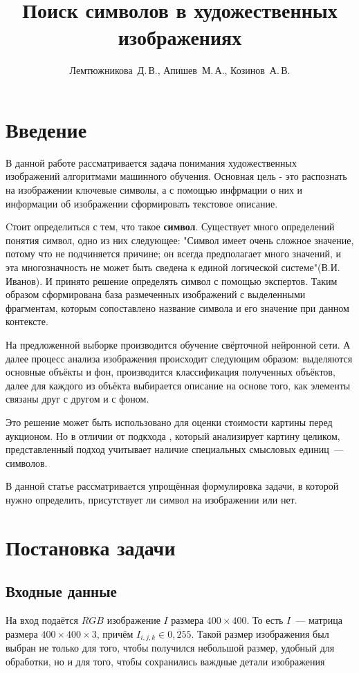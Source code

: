 \documentclass[12pt,twoside]{article}
\title
    [Поиск символов в художественных изображениях] %
    {Поиск символов в художественных изображениях}
\author
    {Лемтюжникова~Д.\,В., Апишев~М.\,А., Козинов~А.\,В.} %
\begin{document}
\maketitle
\section{Введение}

В данной работе рассматривается задача понимания художественных изображений алгоритмами машинного обучения.  Основная цель - это распознать на изображении ключевые символы, а с помощью инфрмации о них и информации об изображении сформировать текстовое описание.

Cтоит определиться с тем, что такое \textbf{символ}. Существует много определений понятия символ, одно из них следующее: "Символ имеет очень сложное значение, потому что не подчиняется причине; он всегда предполагает много значений, и эта многозначность не может быть сведена к единой логической системе"(В.И. Иванов).  И принято решение определять символ с помощью экспертов. Таким образом сформирована база размеченных изображений с выделенными фрагментам, которым сопоставлено название символа и его значение при данном контексте.


На предложенной выборке производится обучение свёрточной нейронной сети. А далее процесс анализа изображения происходит следующим образом: выделяются основные объёкты и фон, производится классификация полученных объёктов, далее для каждого из объёкта выбирается описание на основе того, как элементы связаны друг с другом и с фоном.

Это решение может быть использовано для оценки стоимости картины перед аукционом. Но в отличии от подкхода \cite{art_appraisal}, который анализирует картину целиком, представленный подход учитывает наличие специальных смысловых единиц~--- символов.


В данной статье рассматривается упрощённая формулировка задачи, в которой нужно определить, присутствует ли символ на изображении или нет.

\section{Постановка задачи}
\subsection{Входные данные}
На вход подаётся $RGB$ изображение $I$ размера $400\times400$. То есть $I$~--- матрица размера $400 \times 400 \times 3$, причём $I_{i, j, k} \in \overline{0, 255}$. Такой размер изображения был выбран не только для того, чтобы получился небольшой размер, удобный для обработки, но и для того, чтобы сохранились важдные детали изображения
\end{document}
